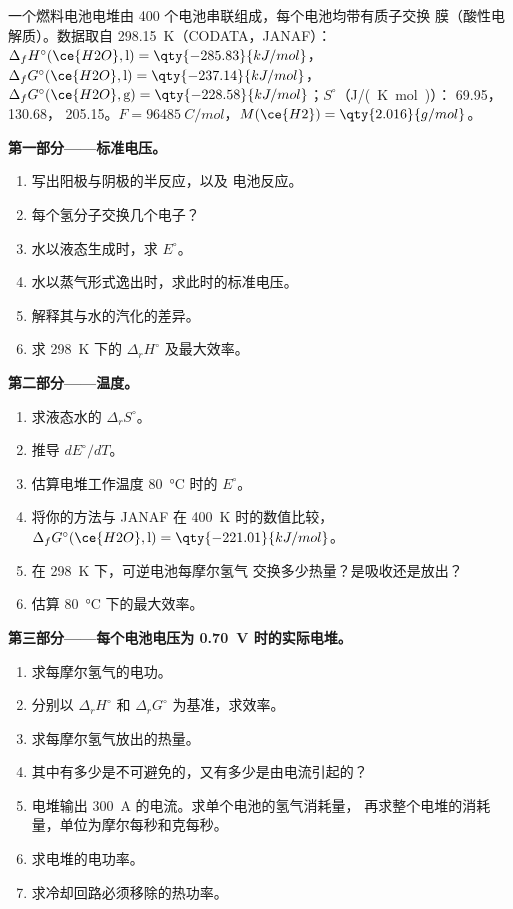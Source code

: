 \begin{problem}
\label{pb:b2:cell-thermodynamics:1}
一个燃料电池电堆由 400 个电池串联组成，每个电池均带有质子交换
膜（酸性电解质）。数据取自 \qty{298.15}{K}（CODATA，JANAF）：
$\Delta_f H^\circ(\ce{H2O}, \text{l}) = \qty{-285.83}{kJ/mol}$，$\Delta_f
G^\circ(\ce{H2O}, \text{l}) = \qty{-237.14}{kJ/mol}$，$\Delta_f G^\circ(\ce{H2O},
\text{g}) = \qty{-228.58}{kJ/mol}$；$S^\circ$（\unit{J/(K.mol)}）： 69.95，
 130.68， 205.15。$F = \qty{96485}{C/mol}$，$M(\ce{H2}) =
\qty{2.016}{g/mol}$。

\medskip
\noindent\textbf{第一部分——标准电压。}
\begin{enumerate}
  \item 写出阳极与阴极的半反应，以及
        电池反应。
  \item 每个氢分子交换几个电子？
  \item 水以液态生成时，求 $E^\circ$。
  \item 水以蒸气形式逸出时，求此时的标准电压。
  \item 解释其与水的汽化的差异。
  \item 求 \qty{298}{K} 下的 $\Delta_r H^\circ$ 及最大效率。
\end{enumerate}

\medskip
\noindent\textbf{第二部分——温度。}
\begin{enumerate}[resume]
  \item 求液态水的 $\Delta_r S^\circ$。
  \item 推导 $dE^\circ/dT$。
  \item 估算电堆工作温度 \qty{80}{\degreeCelsius} 时的
        $E^\circ$。
  \item 将你的方法与 JANAF 在 \qty{400}{K} 时的数值比较，$\Delta_f
        G^\circ(\ce{H2O}, \text{l}) = \qty{-221.01}{kJ/mol}$。
  \item 在 \qty{298}{K} 下，可逆电池每摩尔氢气
        交换多少热量？是吸收还是放出？
  \item 估算 \qty{80}{\degreeCelsius} 下的最大效率。
\end{enumerate}

\medskip
\noindent\textbf{第三部分——每个电池电压为 \qty{0.70}{V} 时的实际电堆。}
\begin{enumerate}[resume]
  \item 求每摩尔氢气的电功。
  \item 分别以 $\Delta_r H^\circ$ 和 $\Delta_r G^\circ$ 为基准，求效率。
  \item 求每摩尔氢气放出的热量。
  \item 其中有多少是不可避免的，又有多少是由电流引起的？
  \item 电堆输出 \qty{300}{A} 的电流。求单个电池的氢气消耗量，
        再求整个电堆的消耗量，单位为摩尔每秒和克每秒。
  \item 求电堆的电功率。
  \item 求冷却回路必须移除的热功率。
\end{enumerate}


\end{problem}

